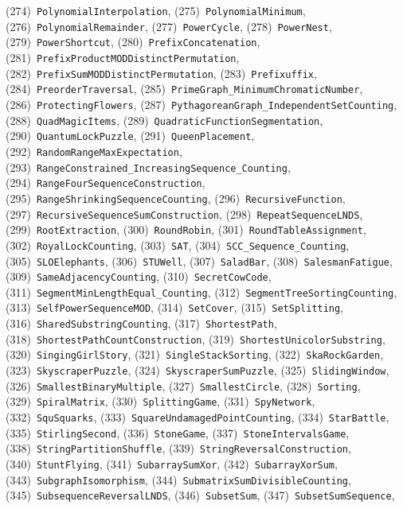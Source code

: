\documentclass{article}
\theoremstyle{plain}
\theoremstyle{definition}
\theoremstyle{remark}
\begin{document}
\begin{flushleft}
(274)~\texttt{PolynomialInterpolation},
(275)~\texttt{PolynomialMinimum},
(276)~\texttt{PolynomialRemainder},
(277)~\texttt{PowerCycle},
(278)~\texttt{PowerNest},
(279)~\texttt{PowerShortcut},
(280)~\texttt{PrefixConcatenation},
(281)~\texttt{PrefixProductMODDistinctPermutation},
(282)~\texttt{PrefixSumMODDistinctPermutation},
(283)~\texttt{Prefixuffix},
(284)~\texttt{PreorderTraversal},
(285)~\texttt{PrimeGraph\_MinimumChromaticNumber},
(286)~\texttt{ProtectingFlowers},
(287)~\texttt{PythagoreanGraph\_IndependentSetCounting},
(288)~\texttt{QuadMagicItems},
(289)~\texttt{QuadraticFunctionSegmentation},
(290)~\texttt{QuantumLockPuzzle},
(291)~\texttt{QueenPlacement},
(292)~\texttt{RandomRangeMaxExpectation},
(293)~\texttt{RangeConstrained\_IncreasingSequence\_Counting},
(294)~\texttt{RangeFourSequenceConstruction},
(295)~\texttt{RangeShrinkingSequenceCounting},
(296)~\texttt{RecursiveFunction},
(297)~\texttt{RecursiveSequenceSumConstruction},
(298)~\texttt{RepeatSequenceLNDS},
(299)~\texttt{RootExtraction},
(300)~\texttt{RoundRobin},
(301)~\texttt{RoundTableAssignment},
(302)~\texttt{RoyalLockCounting},
(303)~\texttt{SAT},
(304)~\texttt{SCC\_Sequence\_Counting},
(305)~\texttt{SLOElephants},
(306)~\texttt{STUWell},
(307)~\texttt{SaladBar},
(308)~\texttt{SalesmanFatigue},
(309)~\texttt{SameAdjacencyCounting},
(310)~\texttt{SecretCowCode},
(311)~\texttt{SegmentMinLengthEqual\_Counting},
(312)~\texttt{SegmentTreeSortingCounting},
(313)~\texttt{SelfPowerSequenceMOD},
(314)~\texttt{SetCover},
(315)~\texttt{SetSplitting},
(316)~\texttt{SharedSubstringCounting},
(317)~\texttt{ShortestPath},
(318)~\texttt{ShortestPathCountConstruction},
(319)~\texttt{ShortestUnicolorSubstring},
(320)~\texttt{SingingGirlStory},
(321)~\texttt{SingleStackSorting},
(322)~\texttt{SkaRockGarden},
(323)~\texttt{SkyscraperPuzzle},
(324)~\texttt{SkyscraperSumPuzzle},
(325)~\texttt{SlidingWindow},
(326)~\texttt{SmallestBinaryMultiple},
(327)~\texttt{SmallestCircle},
(328)~\texttt{Sorting},
(329)~\texttt{SpiralMatrix},
(330)~\texttt{SplittingGame},
(331)~\texttt{SpyNetwork},
(332)~\texttt{SquSquarks},
(333)~\texttt{SquareUndamagedPointCounting},
(334)~\texttt{StarBattle},
(335)~\texttt{StirlingSecond},
(336)~\texttt{StoneGame},
(337)~\texttt{StoneIntervalsGame},
(338)~\texttt{StringPartitionShuffle},
(339)~\texttt{StringReversalConstruction},
(340)~\texttt{StuntFlying},
(341)~\texttt{SubarraySumXor},
(342)~\texttt{SubarrayXorSum},
(343)~\texttt{SubgraphIsomorphism},
(344)~\texttt{SubmatrixSumDivisibleCounting},
(345)~\texttt{SubsequenceReversalLNDS},
(346)~\texttt{SubsetSum},
(347)~\texttt{SubsetSumSequence},

\end{flushleft}
\end{document}
